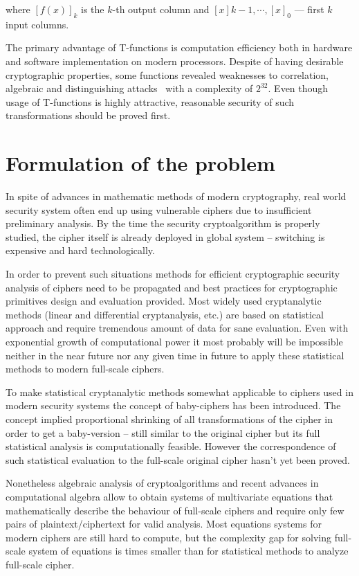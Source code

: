 where $\left[ f(x) \right]_k$ is the $k$-th output column and
$[x]k-1, \cdots, [x]_0$ --- first $k$ input columns.

The primary advantage of T-functions is computation efficiency both in hardware
and software implementation on modern processors. Despite of having desirable
cryptographic properties, some functions revealed weaknesses to correlation,
algebraic and distinguishing attacks~\cite{mycrypt/kunzli_jm05} with a complexity of
$2^{32}$. Even though usage of T-functions is highly attractive, reasonable
security of such transformations should be proved first.


\section{Formulation of the problem}

In spite of advances in mathematic methods of modern cryptography, real world
security system often end up using vulnerable ciphers due to insufficient
preliminary analysis. By the time the security cryptoalgorithm is properly
studied, the cipher itself is already deployed in global system -- switching is
expensive and hard technologically.

In order to prevent such situations methods for efficient cryptographic security
analysis of ciphers need to be propagated and best practices for cryptographic
primitives design and evaluation provided. Most widely used cryptanalytic
methods (linear and differential cryptanalysis, etc.) are based on statistical
approach and require tremendous amount of data for sane evaluation. Even with
exponential growth of computational power it most probably will be impossible
neither in the near future nor any given time in future to apply these
statistical methods to modern full-scale ciphers.

To make statistical cryptanalytic methods somewhat applicable to ciphers used in
modern security systems the concept of baby-ciphers has been introduced. The
concept implied proportional shrinking of all transformations of the cipher in
order to get a baby-version -- still similar to the original cipher but its full
statistical analysis is computationally feasible. However the correspondence of
such statistical evaluation to the full-scale original cipher hasn't yet been
proved.

Nonetheless algebraic analysis of cryptoalgorithms and recent advances in
computational algebra allow to obtain systems of multivariate equations that
mathematically describe the behaviour of full-scale ciphers and require only few
pairs of \mbox{plaintext/ciphertext} for valid analysis. Most equations systems
for modern ciphers are still hard to compute, but the complexity gap for solving
full-scale system of equations is times smaller than for statistical methods to
analyze full-scale cipher.

